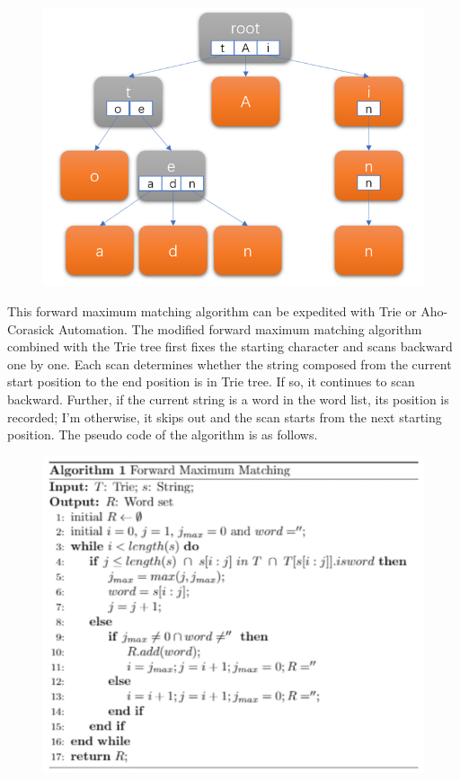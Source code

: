 \begin{figure}
    \centering
    \includegraphics{images/2.3(1).png}
\end{figure} 

This forward maximum matching algorithm can be expedited with Trie or Aho-Corasick Automation. The modified forward maximum matching algorithm combined with the Trie tree first fixes the starting character and scans backward one by one. Each scan determines whether the string composed from the current start position to the end position is in Trie tree. If so, it continues to scan backward. Further, if the current string is a word in the word list, its position is recorded; I'm otherwise, it skips out and the scan starts from the next starting position. The pseudo code of the algorithm is as follows. \par
\begin{figure}
    \centering
    \includegraphics{images/2.3(2).png}
\end{figure} 

